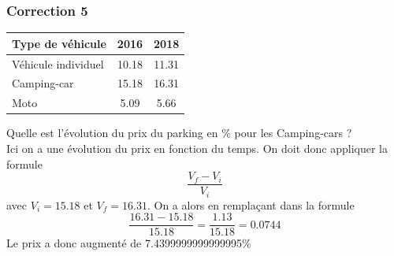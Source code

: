 \documentclass[15pt, mathserif]{beamer}
\begin{document}
\begin{frame}
\vspace{-10mm}
	\frametitle{Correction 5}
 
 \begin{center} 
 \begin{tabular}{|C{3cm}|c|c|} 
 \hline 
 {\small Type de véhicule} & {\small 2016} & {\small 2018} \\ 
 \hline 
 {\small Véhicule individuel} & 10.18& 11.31\\ 
 \hline 
 {\small Camping-car } & 15.18& 16.31\\ 
 \hline 
 {\small Moto } & 5.09& 5.66\\ 
 \hline 
 \end{tabular} 
\end{center} 
  {\small Quelle est l'évolution du prix du parking en \% pour les Camping-cars ?\\ Ici on a une évolution du prix en fonction du temps. On doit donc appliquer la formule} $$\dfrac{V_f-V_i}{V_i}$$ avec $V_i =15.18$ et $V_f=16.31$. On a alors en remplaçant dans la formule $$\dfrac{16.31-15.18}{15.18}= \dfrac{1.13}{15.18} = 0.0744$$ {\small Le prix a donc augmenté de  7.4399999999999995\% } \end{frame}
\end{document}
